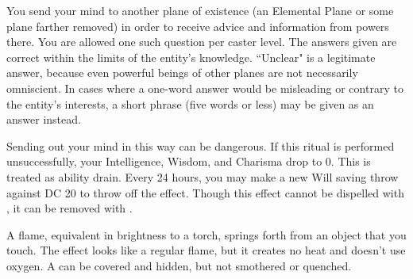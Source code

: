 \begin{spelleffect}
You send your mind to another plane of existence (an Elemental Plane or some plane farther removed) in order to receive advice and information from powers there. You are allowed one such question per caster level. The answers given are correct within the limits of the entity's knowledge. ``Unclear" is a legitimate answer, because even powerful beings of other planes are not necessarily omniscient. In cases where a one-word answer would be misleading or contrary to the entity's interests, a short phrase (five words or less) may be given as an answer instead.

Sending out your mind in this way can be dangerous. If this ritual is performed unsuccessfully, your Intelligence, Wisdom, and Charisma drop to 0. This is treated as ability drain. Every 24 hours, you may make a new Will saving throw against DC 20 to throw off the effect. Though this effect cannot be dispelled with , it can be removed with .
\end{spelleffect}

\begin{spelleffect}
A flame, equivalent in brightness to a torch, springs forth from an object that you touch. The effect looks like a regular flame, but it creates no heat and doesn't use oxygen. A  can be covered and hidden, but not smothered or quenched.
\end{spelleffect}

